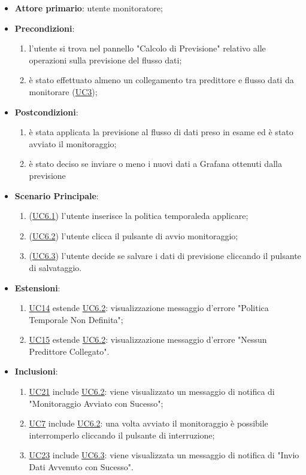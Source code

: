 		\begin{itemize}
			\item\textbf{Attore primario}: utente monitoratore;
			\item\textbf{Precondizioni}: 
				\begin{enumerate}
					\item l'utente si trova nel pannello "Calcolo di Previsione" relativo alle operazioni sulla previsione del flusso dati;
					\item è stato effettuato almeno un collegamento tra predittore e flusso dati da monitorare (\hyperref[par:UC3]{UC3});
				\end{enumerate}		
	\item\textbf{Postcondizioni}: 
				\begin{enumerate}
					\item è stata applicata la previsione al flusso di dati preso in esame ed è stato avviato il monitoraggio; 
					\item è stato deciso se inviare o meno i nuovi dati a Grafana ottenuti dalla previsione
				\end{enumerate}
			\item\textbf{Scenario Principale}: 
				\begin{enumerate} 
					\item (\hyperref[par:UC6.1]{UC6.1}) l'utente inserisce la politica temporale\glo da applicare;
					\item (\hyperref[par:UC6.2]{UC6.2}) l'utente clicca il pulsante di avvio monitoraggio; 
					\item (\hyperref[par:UC6.3]{UC6.3}) l'utente decide se salvare i dati di previsione cliccando il pulsante di salvataggio.
				\end{enumerate}
			\item\textbf{Estensioni}: 
				\begin{enumerate} 
					\item \hyperref[par:UC14]{UC14} estende \hyperref[par:UC6.2]{UC6.2}: visualizzazione messaggio d’errore "Politica Temporale Non Definita";
					\item \hyperref[par:UC15]{UC15} estende \hyperref[par:UC6.2]{UC6.2}: visualizzazione messaggio d’errore "Nessun Predittore Collegato".
				\end{enumerate}
			\item\textbf{Inclusioni}: 
				\begin{enumerate} 
					\item \hyperref[par:UC21]{UC21} include \hyperref[par:UC6.2]{UC6.2}: viene visualizzato un messaggio di notifica di "Monitoraggio Avviato con Sucesso";
					\item \hyperref[par:UC7]{UC7}  include \hyperref[par:UC6.2]{UC6.2}: una volta avviato il monitoraggio è possibile interromperlo cliccando il pulsante di interruzione;
					\item \hyperref[par:UC23]{UC23} include \hyperref[par:UC6.3]{UC6.3}: viene visualizzata un messaggio di notifica di "Invio Dati Avvenuto con Sucesso".
				\end{enumerate}				
		\end{itemize}

